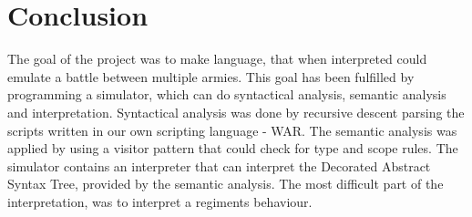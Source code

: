 \section{Conclusion}
	The goal of the project was to make language, that when interpreted could emulate a battle between multiple armies. 
	This goal has been fulfilled by programming a simulator, which can do syntactical analysis, semantic analysis and interpretation.
	Syntactical analysis was done by recursive descent parsing the scripts written in our own scripting language - WAR. The semantic analysis was applied by using 
	a visitor pattern that could check for type and scope rules. The simulator contains an interpreter that can interpret the Decorated Abstract Syntax Tree, provided by the semantic analysis.
	The most difficult part of the interpretation, was to interpret a regiments behaviour. \\
	
